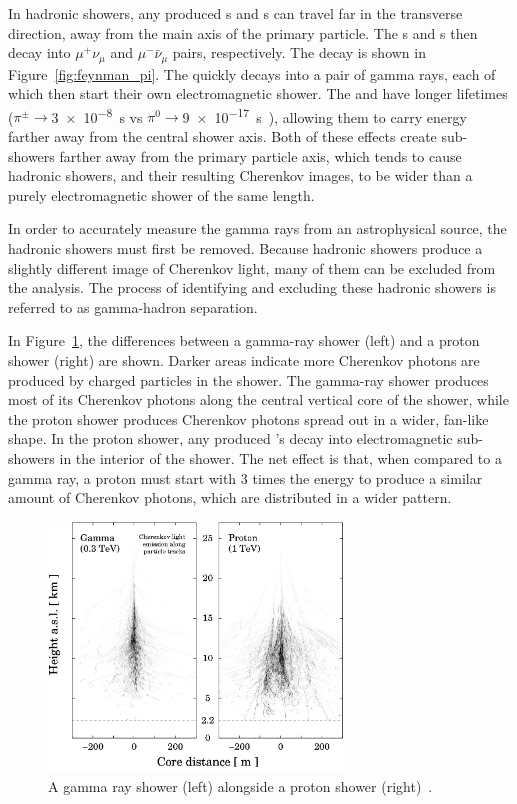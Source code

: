   In hadronic showers, any produced \pip{}s and \pim{}s can travel far in the transverse direction, away from the main axis of the primary particle.
  The \pip{}s and \pim{}s then decay into $\mu^{+}\nu_{\mu}$ and $\mu^{-}\bar{\nu}_{\mu}$ pairs, respectively.
  The \pip{} decay is shown in Figure~\ref{fig:feynman_pi}.
  The \pio{} quickly decays into a pair of gamma rays, each of which then start their own electromagnetic shower.
  The \pip{} and \pim{} have longer lifetimes ($\pi^{\pm} \rightarrow $\SI{3e-8}{s} vs $\pi^{0} \rightarrow $\SI{9e-17}{s}~\cite{pdg_2014}), allowing them to carry energy farther away from the central shower axis.
  Both of these effects create sub-showers farther away from the primary particle axis, which tends to cause hadronic showers, and their resulting Cherenkov images, to be wider than a purely electromagnetic shower of the same length. 

  In order to accurately measure the gamma rays from an astrophysical source, the hadronic showers must first be removed.
  Because hadronic showers produce a slightly different image of Cherenkov light, many of them can be excluded from the analysis.
  The process of identifying and excluding these hadronic showers is referred to as gamma-hadron separation.
  
  In Figure~\ref{fig:gamma_vs_proton_airshower}, the differences between a gamma-ray shower (left) and a proton shower (right) are shown.
  Darker areas indicate more Cherenkov photons are produced by charged particles in the shower.
  The gamma-ray shower produces most of its Cherenkov photons along the central vertical core of the shower, while the proton shower produces Cherenkov photons spread out in a wider, fan-like shape.
  In the proton shower, any produced \pio{}'s decay into electromagnetic sub-showers in the interior of the shower.
  The net effect is that, when compared to a gamma ray, a proton must start with \nicetilde{}3 times the energy to produce a similar amount of Cherenkov photons, which are distributed in a wider pattern.

  \begin{figure}[!b]
    \centering
    \includegraphics[width=0.7\textwidth]{images/showers_gamma_proton}
    \caption[Gamma Ray and Proton Showers]{
      A gamma ray shower (left) alongside a proton shower (right)~\cite{Bernlohr2008149}.
    }
    \label{fig:gamma_vs_proton_airshower}
  \end{figure}
  
  \FloatBarrier

